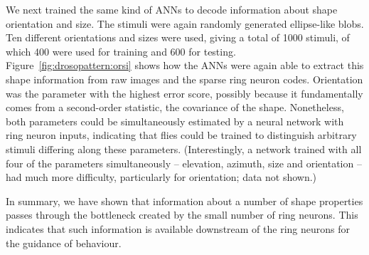 We next trained the same kind of ANNs to decode information about shape orientation and size. The stimuli were again randomly generated ellipse-like blobs. Ten different orientations and sizes were used, giving a total of 1000 stimuli, of which 400 were used for training and 600 for testing. Figure~\ref{fig:drosopattern:orsi} shows how the ANNs were again able to extract this shape information from raw images and the sparse ring neuron codes. Orientation was the parameter with the highest error score, possibly because it fundamentally comes from a second-order statistic, the covariance of the shape. Nonetheless, both parameters could be simultaneously estimated by a neural network with ring neuron inputs, indicating that flies could be trained to distinguish arbitrary stimuli differing along these parameters.
(Interestingly, a network trained with all four of the parameters simultaneously -- elevation, azimuth, size and orientation -- had much more difficulty, particularly for orientation; data not shown.)



In summary, we have shown that information about a number of shape properties passes through the bottleneck created by the small number of ring neurons.
This indicates that such information is available downstream of the ring neurons for the guidance of behaviour.
